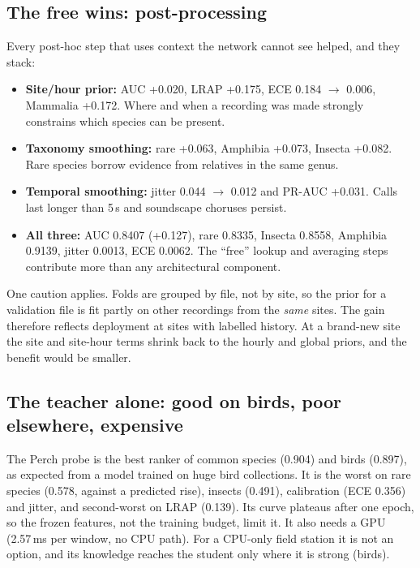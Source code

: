 \documentclass[11pt]{article}
\begin{document}
\subsection{The free wins: post-processing}
Every post-hoc step that uses context the network cannot see helped, and they
stack:
\begin{itemize}
  \item \textbf{Site/hour prior:} AUC +0.020, LRAP +0.175, ECE 0.184
        $\rightarrow$ 0.006, Mammalia +0.172. Where and when a recording was
        made strongly constrains which species can be present.
  \item \textbf{Taxonomy smoothing:} rare +0.063, Amphibia +0.073, Insecta
        +0.082. Rare species borrow evidence from relatives in the same genus.
  \item \textbf{Temporal smoothing:} jitter 0.044 $\rightarrow$ 0.012 and
        PR-AUC +0.031. Calls last longer than 5\,s and soundscape choruses
        persist.
  \item \textbf{All three:} AUC 0.8407 (+0.127), rare 0.8335, Insecta 0.8558,
        Amphibia 0.9139, jitter 0.0013, ECE 0.0062. The ``free'' lookup and
        averaging steps contribute more than any architectural component.
\end{itemize}
One caution applies. Folds are grouped by file, not by site, so the prior for
a validation file is fit partly on other recordings from the \emph{same}
sites. The gain therefore reflects deployment at sites with labelled history.
At a brand-new site the site and site-hour terms shrink back to the hourly and
global priors, and the benefit would be smaller.

\subsection{The teacher alone: good on birds, poor elsewhere, expensive}
The Perch probe is the best ranker of common species (0.904) and birds
(0.897), as expected from a model trained on huge bird collections. It is the
worst on rare species (0.578, against a predicted rise), insects (0.491),
calibration (ECE 0.356) and jitter, and second-worst on LRAP (0.139). Its curve plateaus after one
epoch, so the frozen features, not the training budget, limit it. It also
needs a GPU (2.57\,ms per window, no CPU path). For a CPU-only field station
it is not an option, and its knowledge reaches the student only where it is
strong (birds).
\end{document}
